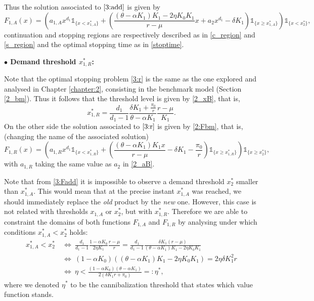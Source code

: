 Thus the solution associated to $\eqref{3:add}$ is given by 
\begin{equation}
F_{1,A}(x)= \left(  a_{1,A}x^{d_1} \mathds{1}_{ \{ x<x^*_{1,A}\}} +
\left(  \frac{(\theta-\alpha K_1)K_1-2 \eta K_0 K_1}{r-\mu} x+
a_2 x^{d_1} - \delta K_1 \right)  \mathds{1}_{ \{ x \geq x^*_{1,A} \}} \right)  \mathds{1}_{ \{   x < x_2^*  \}},
\label{3:Fadd}
\end{equation}
continuation and stopping regions are respectively described as in \eqref{c_region} and \eqref{s_region} and the optimal stopping time as in \eqref{stoptime}.


\textbf{$\bullet$ Demand threshold $x^*_{1,R}$:}

Note that the optimal stopping problem \eqref{3:r} is the same as the one explored and analysed in Chapter \ref{chapter:2}, consisting in the benchmark model (Section \ref{2_bm}).
Thus it follows that the threshold level is given by \eqref{2_xB}, that is,
\begin{equation}
x^*_{1,R}=\frac{d_1}{d_1-1} \frac{ \delta K_1  +\frac{\pi_0}{r} }{\theta-\alpha K_1} \frac{r-\mu}{K_1}.
\label{3_x1R}
\end{equation}
On the other side the solution associated to $\eqref{3:r}$ is given by \eqref{2:Fbm}, that is, (changing the name of the associated solution)
\begin{equation}
F_{1,R}(x)= \left(  a_{1,R}x^{d_1} \mathds{1}_{ \{ x<x^*_{1,R}\}} +
\left(  \frac{(\theta-\alpha K_1)K_1 x}{r-\mu} - \delta K_1  -\frac{\pi_0}{r}\right)  \mathds{1}_{ \{ x \geq x^*_{1,R}\}} \right) \mathds{1}_{ \{ x \geq x^*_2\}} ,
\label{3:Fr}
\end{equation}
with $a_{1,R}$ taking the same value as $a_2$ in \eqref{2_aB}.


Note that from \eqref{3:Fadd} it is impossible to observe a demand threshold $x_2^*$ smaller than $x_{1,A}^*$. This would mean that at the precise instant $x_{1,A}^*$ was reached, we should immediately replace the \textit{old} product by the \textit{new} one. However, this case is not related with thresholds $x_{1,A}$ or $x_2^*$, but with $x_{1,R}^*$.
Therefore we are able to constraint the domains of both functions $F_{1,A}$ and $F_{1,R}$ by analysing under which conditions $x_{1,A}^*<x^*_2$ holds:
\begin{align}
x_{1,A}^*<x_2^* \ &\Leftrightarrow \ \frac{d_1}{d_1-1} \frac{1-\alpha K_0}{2 \eta K_1} \frac{r-\mu}{r} = \frac{d_1}{d_1-1} \frac{\delta K_1 (r-\mu)}{(\theta-\alpha K_1)K_1-2\eta K_0 K_1} \nonumber \\
&\Leftrightarrow \ (1-\alpha K_0) ((\theta-\alpha K_1)K_1-2\eta K_0 K_1)=2 \eta \delta K_1^2 r 
 \nonumber \\
&\Leftrightarrow \ \eta <\frac{(1-\alpha K_0)(\theta-\alpha K_1)}{2(\delta K_1 r + \pi_0)}=: \eta^*, \label{3_eta*}
\end{align}
where we denoted $\eta^*$ to be the cannibalization threshold that states which value function stands.

